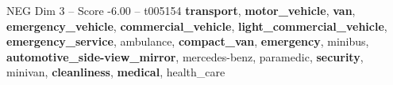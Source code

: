 \begin{textsample}{NEG Dim 3 – Score -6.00 – t005154}  \label{ex:f3_neg_019}
\textbf{transport}, \textbf{motor\_vehicle}, \textbf{van}, \textbf{emergency\_vehicle}, \textbf{commercial\_vehicle}, \textbf{light\_commercial\_vehicle}, \textbf{emergency\_service}, ambulance, \textbf{compact\_van}, \textbf{emergency}, minibus, \textbf{automotive\_side-view\_mirror}, mercedes-benz, paramedic, \textbf{security}, minivan, \textbf{cleanliness}, \textbf{medical}, health\_care

\end{textsample}

